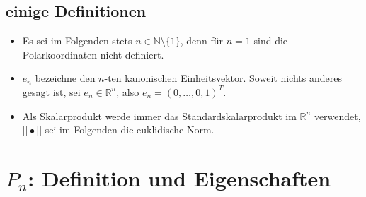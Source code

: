 \documentclass[a4paper,11pt]{report}
\theoremstyle{definition}
\newcommand{\R}{{\ensuremath{\mathbb{R}}}}
\newcommand{\N}{{\ensuremath{\mathbb{N}}}}
\begin{document}
\section{einige Definitionen}
\begin{itemize}
\item Es sei im Folgenden stets $n\in\N\setminus\{1\}$, denn für $n=1$ sind die Polarkoordinaten nicht definiert.
\item $e_n$ bezeichne den $n$-ten kanonischen Einheitsvektor. Soweit nichts anderes gesagt ist, sei $e_n\in\R^n$, also $e_n=(0,\ldots,0,1)^T$.
\item Als Skalarprodukt werde immer das Standardskalarprodukt im $\R^n$ verwendet, $||\bullet||$ sei im Folgenden die euklidische Norm.
\end{itemize}
\chapter{$P_n$: Definition und Eigenschaften}
\end{document}

